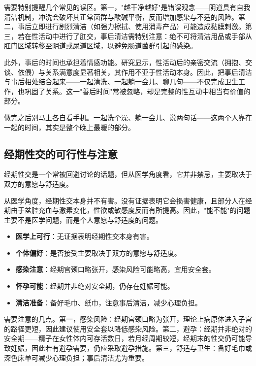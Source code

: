 \documentclass[12pt,UTF8]{ctexbook}
\newcommand{\keyword}[1]{\textbf{#1}}
\begin{document}
需要特别提醒几个常见的误区。第一，"越干净越好"是错误观念——阴道具有自我清洁机制，冲洗会破坏其正常菌群与酸碱平衡，反而增加感染与不适的风险。第二，事后立即进行剧烈清洁（如强力擦拭、使用消毒产品）可能造成黏膜刺激。第三，若在性活动中进行了肛交，事后清洁需特别注意：绝不可将清洁用品或手部从肛门区域转移至阴道或尿道区域，以避免肠道菌群引起的感染。

此外，事后的时间也承担着情感功能。研究显示，性活动后的亲密交流（拥抱、交谈、依偎）与关系满意度显著相关，其作用不亚于性活动本身。因此，把事后清洁与事后相处结合起来——一起清洗、一起躺一会儿、聊几句——不仅完成卫生工作，也巩固了关系。这一"善后时间"常被忽略，却是完整的性互动中相当有价值的部分。

\begin{tcolorbox}[colback=pink!5!white,colframe=red!50!black,title=贴心小叮咛]
做完之后别马上各自看手机。一起洗个澡、躺一会儿、说两句话——这两个人靠在一起的时间，其实是整个晚上最暖的部分。
\end{tcolorbox}
\subsection{经期性交的可行性与注意}

经期性交是一个常被回避讨论的话题，但从医学角度看，它并非禁忌，主要取决于双方的意愿与舒适度。

从医学角度，经期性交本身并不有害。没有证据表明它会损害健康，且部分人在经期由于盆腔充血与激素变化，性欲或敏感度反而有所提高。因此，"能不能"的问题主要不是医学问题，而是个人意愿与舒适度的问题。

\begin{itemize}
  \item \keyword{医学上可行}：无证据表明经期性交本身有害。
  \item \keyword{个体偏好}：是否接受主要取决于双方的意愿与舒适度。
  \item \keyword{感染注意}：经期宫颈口略张开，感染风险可能略高，宜用安全套。
  \item \keyword{怀孕可能}：经期并非绝对安全期，仍存在妊娠可能。
  \item \keyword{清洁准备}：备好毛巾、纸巾，注意事后清洁，减少心理负担。
\end{itemize}

需要注意的几点。第一，感染风险：经期宫颈口略为张开，理论上病原体进入子宫的路径更短，因此建议使用安全套以降低感染风险。第二，避孕：经期并非绝对的安全期——精子在女性体内可存活数日，若月经周期较短，经期末的性交仍可能导致妊娠，因此若有避孕需要，仍应采取避孕措施。第三，舒适与卫生：备好毛巾或深色床单可减少心理负担；事后清洁尤为重要。
\end{document}
